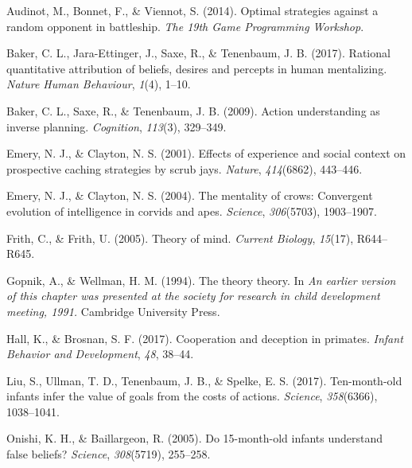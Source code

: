 \documentclass[10pt, letterpaper]{article}
\newenvironment{CSLReferences}%
  {}%
  {\par}
\begin{document}
\hypertarget{refs}{}
\begin{CSLReferences}{1}{0}
\leavevmode{}%
Audinot, M., Bonnet, F., \& Viennot, S. (2014). Optimal strategies
against a random opponent in battleship. \emph{The 19th Game Programming
Workshop}.

\leavevmode{}%
Baker, C. L., Jara-Ettinger, J., Saxe, R., \& Tenenbaum, J. B. (2017).
Rational quantitative attribution of beliefs, desires and percepts in
human mentalizing. \emph{Nature Human Behaviour}, \emph{1}(4), 1--10.

\leavevmode{}%
Baker, C. L., Saxe, R., \& Tenenbaum, J. B. (2009). Action understanding
as inverse planning. \emph{Cognition}, \emph{113}(3), 329--349.

\leavevmode{}%
Emery, N. J., \& Clayton, N. S. (2001). Effects of experience and social
context on prospective caching strategies by scrub jays. \emph{Nature},
\emph{414}(6862), 443--446.

\leavevmode{}%
Emery, N. J., \& Clayton, N. S. (2004). The mentality of crows:
Convergent evolution of intelligence in corvids and apes.
\emph{Science}, \emph{306}(5703), 1903--1907.

\leavevmode{}%
Frith, C., \& Frith, U. (2005). Theory of mind. \emph{Current Biology},
\emph{15}(17), R644--R645.

\leavevmode{}%
Gopnik, A., \& Wellman, H. M. (1994). The theory theory. In \emph{An
earlier version of this chapter was presented at the society for
research in child development meeting, 1991.} Cambridge University
Press.

\leavevmode{}%
Hall, K., \& Brosnan, S. F. (2017). Cooperation and deception in
primates. \emph{Infant Behavior and Development}, \emph{48}, 38--44.

\leavevmode{}%
Liu, S., Ullman, T. D., Tenenbaum, J. B., \& Spelke, E. S. (2017).
Ten-month-old infants infer the value of goals from the costs of
actions. \emph{Science}, \emph{358}(6366), 1038--1041.

\leavevmode{}%
Onishi, K. H., \& Baillargeon, R. (2005). Do 15-month-old infants
understand false beliefs? \emph{Science}, \emph{308}(5719), 255--258.


\end{CSLReferences}
\end{document}
